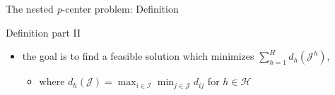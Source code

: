\documentclass[utf8,aspectratio=169,ngerman,english]{beamer}
\begin{document}
\begin{frame}{The nested \textit{p}-center problem: Definition}
\begin{minipage}{0.48\textwidth}
\begin{block}{Definition part II}
\begin{itemize}
                      \begin{itemize}
                          \item with $\left\lvert \mathcal J^h \right\rvert = p^h$ for $h \in \mathcal H$,
                          \item for which $\mathcal J^h \subseteq \mathcal J^{h+1}$ for $h = 1, \dots, H-1$ holds \pause
                      \end{itemize}
                \item the goal is to find a feasible solution which minimizes $\sum_{h = 1}^{H} d_h(\mathcal J^h)$,
                      \begin{itemize}
                          \item where $d_h(\mathcal J) = \max_{i \in \mathcal I}\min_{j \in \mathcal J} d_{ij}$ for $h \in \mathcal H$
                      \end{itemize}
            \end{itemize}
        \end{block}
    \end{minipage}
\end{frame}
\end{document}
